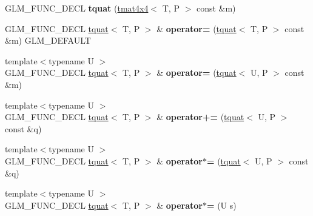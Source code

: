 \begin{DoxyCompactItemize}
\item 
\hypertarget{structglm_1_1tquat_a738e6d5bcc5a75cca8ac119edafaeafa}{G\-L\-M\-\_\-\-F\-U\-N\-C\-\_\-\-D\-E\-C\-L {\bfseries tquat} (\hyperlink{structglm_1_1tmat4x4}{tmat4x4}$<$ T, P $>$ const \&m)}\label{structglm_1_1tquat_a738e6d5bcc5a75cca8ac119edafaeafa}

\item 
\hypertarget{structglm_1_1tquat_a9133348e2b628f05b07ab6907cc5e4ef}{G\-L\-M\-\_\-\-F\-U\-N\-C\-\_\-\-D\-E\-C\-L \hyperlink{structglm_1_1tquat}{tquat}$<$ T, P $>$ \& {\bfseries operator=} (\hyperlink{structglm_1_1tquat}{tquat}$<$ T, P $>$ const \&m) G\-L\-M\-\_\-\-D\-E\-F\-A\-U\-L\-T}\label{structglm_1_1tquat_a9133348e2b628f05b07ab6907cc5e4ef}

\item 
\hypertarget{structglm_1_1tquat_af00985afe704157487281c4c3eb4f790}{{\footnotesize template$<$typename U $>$ }\\G\-L\-M\-\_\-\-F\-U\-N\-C\-\_\-\-D\-E\-C\-L \hyperlink{structglm_1_1tquat}{tquat}$<$ T, P $>$ \& {\bfseries operator=} (\hyperlink{structglm_1_1tquat}{tquat}$<$ U, P $>$ const \&m)}\label{structglm_1_1tquat_af00985afe704157487281c4c3eb4f790}

\item 
\hypertarget{structglm_1_1tquat_a6a659798636ad7f9d8cb392904b61020}{{\footnotesize template$<$typename U $>$ }\\G\-L\-M\-\_\-\-F\-U\-N\-C\-\_\-\-D\-E\-C\-L \hyperlink{structglm_1_1tquat}{tquat}$<$ T, P $>$ \& {\bfseries operator+=} (\hyperlink{structglm_1_1tquat}{tquat}$<$ U, P $>$ const \&q)}\label{structglm_1_1tquat_a6a659798636ad7f9d8cb392904b61020}

\item 
\hypertarget{structglm_1_1tquat_a3aaba279045f689985499e21aafd1ab8}{{\footnotesize template$<$typename U $>$ }\\G\-L\-M\-\_\-\-F\-U\-N\-C\-\_\-\-D\-E\-C\-L \hyperlink{structglm_1_1tquat}{tquat}$<$ T, P $>$ \& {\bfseries operator$\ast$=} (\hyperlink{structglm_1_1tquat}{tquat}$<$ U, P $>$ const \&q)}\label{structglm_1_1tquat_a3aaba279045f689985499e21aafd1ab8}

\item 
\hypertarget{structglm_1_1tquat_ac92bf2dc48e2c7e3f4976b25a5daf78a}{{\footnotesize template$<$typename U $>$ }\\G\-L\-M\-\_\-\-F\-U\-N\-C\-\_\-\-D\-E\-C\-L \hyperlink{structglm_1_1tquat}{tquat}$<$ T, P $>$ \& {\bfseries operator$\ast$=} (U s)}\label{structglm_1_1tquat_ac92bf2dc48e2c7e3f4976b25a5daf78a}


\end{DoxyCompactItemize}
